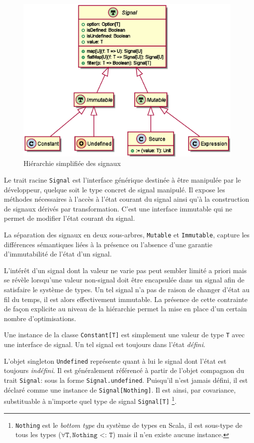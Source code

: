 \begin{figure}[!h]
	\centering
	\includegraphics[width=12cm]{img/signals_simple}
	\caption{Hiérarchie simplifiée des signaux}
	\label{fig:sig-simple-hierarchy}	
\end{figure}

Le trait racine \texttt{Signal} est l'interface générique destinée à être manipulée par le développeur, quelque soit le type concret de signal manipulé. Il expose les méthodes nécessaires à l'accès à l'état courant du signal ainsi qu'à la construction de signaux dérivés par transformation. C'est une interface immutable qui ne permet de modifier l'état courant du signal.

La séparation des signaux en deux sous-arbres, \texttt{Mutable} et \texttt{Immutable}, capture les différences sémantiques liées à la présence ou l'absence d'une garantie d'immutabilité de l'état d'un signal.

L'intérêt d'un signal dont la valeur ne varie pas peut sembler limité a priori mais se révèle lorsqu'une valeur non-signal doit être encapsulée dans un signal afin de satisfaire le système de types. Un tel signal n'a pas de raison de changer d'état au fil du temps, il est alors effectivement immutable. La présence de cette contrainte de façon explicite au niveau de la hiérarchie permet la mise en place d'un certain nombre d'optimisations.

Une instance de la classe \texttt{Constant[T]} est simplement une valeur de type \texttt{T} avec une interface de signal. Un tel signal est toujours dans l'état \emph{défini}.

L'objet singleton \texttt{Undefined} représente quant à lui le signal dont l'état est toujours \emph{indéfini}. Il est généralement référencé à partir de l'objet compagnon du trait \texttt{Signal}: sous la forme \texttt{Signal.undefined}. Puisqu'il n'est jamais défini, il est déclaré comme une instance de \texttt{Signal[Nothing]}. Il est ainsi, par covariance, substituable à n'importe quel type de signal \texttt{Signal[T]} \footnote{\texttt{Nothing} est le \emph{bottom type} du système de types en Scala, il est sous-type de tous les types ($\forall \texttt{T}, \texttt{Nothing <: T}$) mais il n'en existe aucune instance.}.

